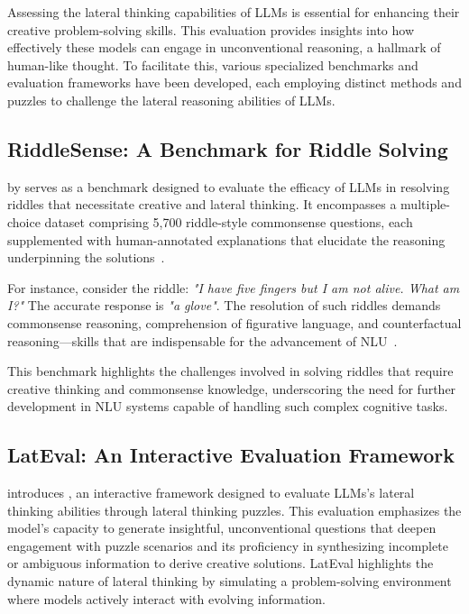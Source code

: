 Assessing the lateral thinking capabilities of \acp{LLM} is essential for enhancing their creative problem-solving skills. This evaluation provides insights into how effectively these models can engage in unconventional reasoning, a hallmark of human-like thought. To facilitate this, various specialized benchmarks and evaluation frameworks have been developed, each employing distinct methods and puzzles to challenge the lateral reasoning abilities of \acp{LLM}.

\subsection{RiddleSense: A Benchmark for Riddle Solving}

 by \textcite{linRiddleSenseReasoningRiddle2021} serves as a benchmark designed to evaluate the efficacy of \acp{LLM} in resolving riddles that necessitate creative and lateral thinking. It encompasses a multiple-choice dataset comprising 5,700 riddle-style commonsense questions, each supplemented with human-annotated explanations that elucidate the reasoning underpinning the solutions~\cite{linRiddleSenseReasoningRiddle2021}.

For instance, consider the riddle: \textit{"I have five fingers but I am not alive. What am I?"} The accurate response is \textit{"a glove"}. The resolution of such riddles demands commonsense reasoning, comprehension of figurative language, and counterfactual reasoning—skills that are indispensable for the advancement of \ac{NLU}~\cite{linRiddleSenseReasoningRiddle2021}.

This benchmark highlights the challenges involved in solving riddles that require creative thinking and commonsense knowledge, underscoring the need for further development in \ac{NLU} systems capable of handling such complex cognitive tasks.

\subsection{LatEval: An Interactive Evaluation Framework}

\textcite{huangLatEvalInteractiveLLMs2024} introduces , an interactive framework designed to evaluate \acp{LLM}'s lateral thinking abilities through lateral thinking puzzles. This evaluation emphasizes the model's capacity to generate insightful, unconventional questions that deepen engagement with puzzle scenarios and its proficiency in synthesizing incomplete or ambiguous information to derive creative solutions. LatEval highlights the dynamic nature of lateral thinking by simulating a problem-solving environment where models actively interact with evolving information.

